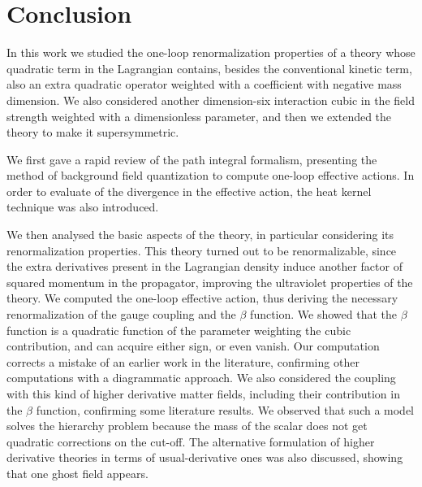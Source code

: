 

\chapter*{Conclusion}



		\fancyhead{} %
			\fancyhead[LE]{\scshape \leftmark}
			\fancyhead[RO]{\scshape \rightmark}
			\fancyfoot[LE,RO]{\thepage}
			\fancyfoot[LO,CE]{ }
			\fancyfoot[CO,RE]{ }
		 		\renewcommand{\headrulewidth}{0.4pt}
			\renewcommand{\footrulewidth}{0.4pt}
		\pagestyle{fancy}
		\renewcommand{\sectionmark}[1]{\markright{\thesection.\ #1}}
		\renewcommand{\chaptermark}[1]{\markboth{\chaptername\ \thechapter.\ #1}{}}


In this work we studied the one-loop renormalization properties of a \ym{} theory whose quadratic term in the Lagrangian contains, besides the conventional kinetic term, also an extra quadratic operator weighted with a coefficient with negative mass dimension. We also considered another dimension-six interaction cubic in the field strength weighted with a dimensionless parameter, and then we extended the theory to make it supersymmetric.


We first gave a rapid review of the path integral formalism, presenting the method of background field quantization to compute one-loop effective actions. In order to evaluate of the divergence in the effective action, the heat kernel technique was also introduced.


We then analysed the basic aspects of the theory, in particular considering its renormalization properties. This theory turned out to be renormalizable, since the extra derivatives present in the Lagrangian density induce another factor of squared momentum in the propagator, improving the ultraviolet properties of the theory. 
We computed the one-loop effective action, thus deriving the necessary renormalization of the gauge coupling and the $\beta$ function. We showed that the $\beta$ function is a quadratic function of the parameter weighting the cubic contribution, and can acquire either sign, or even vanish. Our computation corrects a mistake of an earlier work in the literature, confirming other computations with a  diagrammatic approach.
We also considered the coupling with this kind of higher derivative matter fields, including their contribution in the $\beta$ function, confirming some literature results. We observed that such a model solves the hierarchy problem because the mass of the scalar does not get quadratic corrections on the cut-off.
The alternative formulation of higher derivative theories in terms of usual-derivative ones was also discussed, showing that one ghost field appears. 


